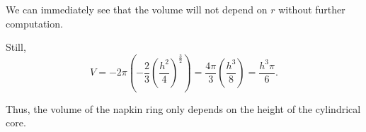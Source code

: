 \documentclass[../hw6.tex]{subfiles}
\begin{document}
We can immediately see that the volume will not depend on $r$ without further computation.

Still,
\[V = -2\pi\left( -\frac{2}{3} {\left( \frac{h^2}{4} \right)}^{\frac{3}{2}} \right) = \frac{4\pi}{3} \left( \frac{h^3}{8} \right) = \frac{h^3\pi}{6}.\]

Thus, the volume of the napkin ring only depends on the height of the cylindrical core.
\end{document}
